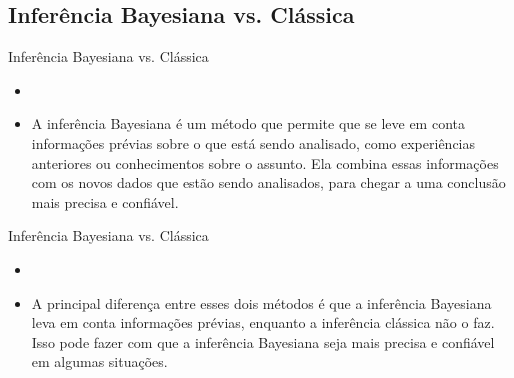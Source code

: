 \documentclass{beamer}
\begin{document}
\subsection{Inferência Bayesiana vs. Clássica}
\begin{frame}{Inferência Bayesiana vs. Clássica}
    
    \begin{itemize}
    
    \item {}
    \vspace{1cm}
    \item A inferência Bayesiana é um método que permite que se leve em conta informações prévias sobre o que está sendo analisado, como experiências anteriores ou conhecimentos sobre o assunto. Ela combina essas informações com os novos dados que estão sendo analisados, para chegar a uma conclusão mais precisa e confiável. 
    \end{itemize}
    
\end{frame}

\begin{frame}{Inferência Bayesiana vs. Clássica}
 \begin{itemize}
    \item {}
    \vspace{1cm}
    \item A principal diferença entre esses dois métodos é que a inferência Bayesiana leva em conta informações prévias, enquanto a inferência clássica não o faz. Isso pode fazer com que a inferência Bayesiana seja mais precisa e confiável em algumas situações.
    \end{itemize}
    
\end{frame}
\end{document}

